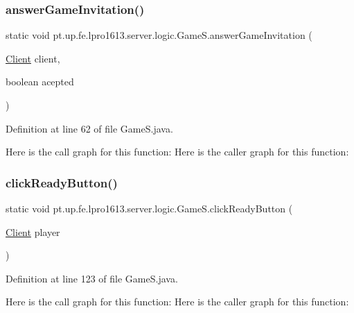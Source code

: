 \subsubsection{\texorpdfstring{answer\+Game\+Invitation()}{answerGameInvitation()}}
{\footnotesize\ttfamily static void pt.\+up.\+fe.\+lpro1613.\+server.\+logic.\+Game\+S.\+answer\+Game\+Invitation (\begin{DoxyParamCaption}\item[{\hyperlink{classpt_1_1up_1_1fe_1_1lpro1613_1_1server_1_1conn_1_1_client}{Client}}]{client,  }\item[{boolean}]{acepted }\end{DoxyParamCaption})\hspace{0.3cm}{\ttfamily [static]}}



Definition at line 62 of file Game\+S.\+java.

Here is the call graph for this function\+:
Here is the caller graph for this function\+:
\hypertarget{classpt_1_1up_1_1fe_1_1lpro1613_1_1server_1_1logic_1_1_game_s_a3f0990efe67cd38218cba8877ddd075c}{}\label{classpt_1_1up_1_1fe_1_1lpro1613_1_1server_1_1logic_1_1_game_s_a3f0990efe67cd38218cba8877ddd075c} 
\subsubsection{\texorpdfstring{click\+Ready\+Button()}{clickReadyButton()}}
{\footnotesize\ttfamily static void pt.\+up.\+fe.\+lpro1613.\+server.\+logic.\+Game\+S.\+click\+Ready\+Button (\begin{DoxyParamCaption}\item[{\hyperlink{classpt_1_1up_1_1fe_1_1lpro1613_1_1server_1_1conn_1_1_client}{Client}}]{player }\end{DoxyParamCaption})\hspace{0.3cm}{\ttfamily [static]}}



Definition at line 123 of file Game\+S.\+java.

Here is the call graph for this function\+:
Here is the caller graph for this function\+:
\hypertarget{classpt_1_1up_1_1fe_1_1lpro1613_1_1server_1_1logic_1_1_game_s_a094065fc706220db9e598e09c96a60c2}{}\label{classpt_1_1up_1_1fe_1_1lpro1613_1_1server_1_1logic_1_1_game_s_a094065fc706220db9e598e09c96a60c2} 
